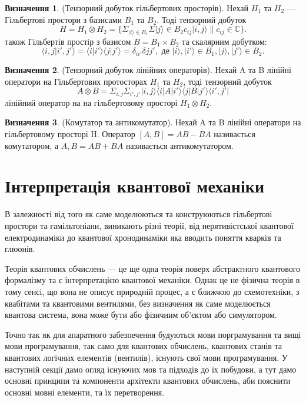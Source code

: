 \documentclass{article}
\theoremstyle{definition}
\newtheorem{definition}{Визначення}
\begin{document}
\begin{definition} (Тензорний добуток гільбертових просторів).
Нехай $H_1$ та $H_2$ --- Гільбертові простори з базисами $B_1$ та $B_2$.
Тоді тензорний добуток
$$
H = H_1 \otimes H_2 = \{ \Sigma_{|i\rangle \in B_1} \Sigma{|j\rangle \in B_2} c_{ij}|i,j\rangle \| c_{ij} \in \mathbb{C} \}.
$$
також Гільбертів простір з базисом $B = B_1 \times B_2$ та скалярним добутком:
$$
\langle i,j | i',j' \rangle = \langle i | i' \rangle \langle j | j' \rangle  = \delta_{ii'}\delta{jj'}, \text{\ де\ } |i\rangle,|i'\rangle \in B_1, |j\rangle,|j'\rangle \in B_2.
$$
\end{definition}

\begin{definition} (Тензорний добуток лінійних операторів).
Нехай A та B лінійні оператори на Гільбертових протосторах $H_1$ та $H_2$, тоді
тензорний добуток
$$
A \otimes B = \Sigma_{i,j}\Sigma_{i',j'}|i,j\rangle\langle i|A|i'\rangle\langle j|B|j'\rangle\langle i',j'|
$$
лінійний оператор на на гільбертовому просторі $H_1\otimes H_2$.
\end{definition}

\begin{definition} (Комутатор та антикомутатор).
Нехай A та B лінійні оператори на гільбертовому просторі H.
Оператор $[A,B] = AB - BA$ називається комутатором,
а ${A,B} = AB + BA$ називається антикомутатором.
\end{definition}

\section{Інтерпретація квантової механіки}

В залежності від того як саме моделюються та конструюються
гільбертові простори та гамільтоніани, виникають різні теорії,
від нерятивістської квантової електродинаміки до квантової хронодинаміки яка
вводить поняття кварків та глюонів.

Теорія квантових обчислень --- це ще одна теорія поверх абстрактного квантового формалізму та
є інтерпретацією квантової механіки.
Однак це не фізична теорія в тому сенсі, що вона не описує природній процес,
а є ближчою до схемотехніки, з квабітами та квантовими вентилями, без визначення
як саме моделюється квантова система, вона може бути або фізичним об'єктом або симулятором.

Точно так як для апаратного забезпечення будуються мови порграмування та вищі мови програмування,
так само для квантових обчислень, квантових станів та квантових логічних елементів (вентилів),
існують свої мови програмування. У наступній секції дамо огляд існуючих мов та підходів до їх
побудови, а тут дамо основні принципи та компоненти архітекти квантових
обчислень, аби пояснити основні мовні елементи, та їх перетворення.
\end{document}
